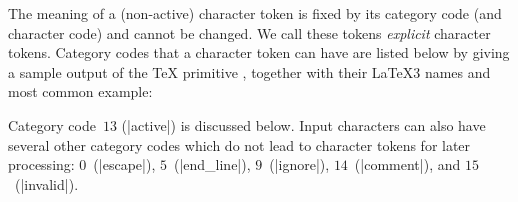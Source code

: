\documentclass{l3doc}
\begin{document}
The meaning of a (non-active) character token is fixed by its category
code (and character code) and cannot be changed.  We call these tokens
\emph{explicit} character tokens.  Category codes that a character token
can have are listed below by giving a sample output of the \TeX{}
primitive , together with their \LaTeX3 names and most
common example:
Category code~$13$ (|active|) is discussed below.  Input characters can
also have several other category codes which do not lead to character
tokens for later processing: $0$~(|escape|), $5$~(|end_line|),
$9$~(|ignore|), $14$~(|comment|), and $15$~(|invalid|).
\end{document}
